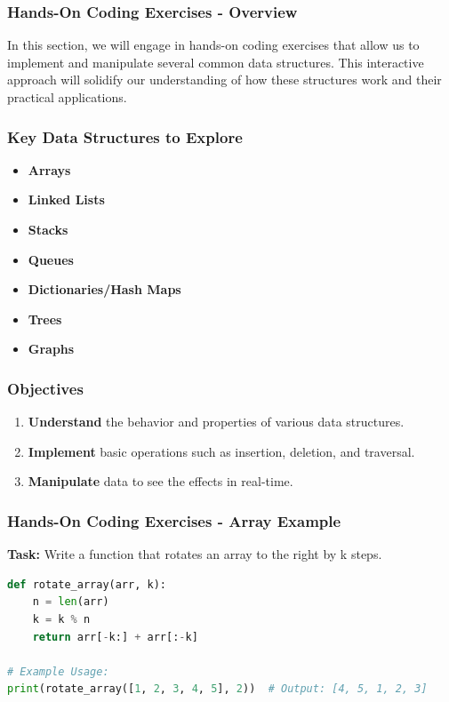 \documentclass{beamer}
\begin{document}
\begin{frame}[fragile]
    \frametitle{Hands-On Coding Exercises - Overview}
    In this section, we will engage in hands-on coding exercises that allow us to implement and manipulate several common data structures. This interactive approach will solidify our understanding of how these structures work and their practical applications.
\end{frame}

\begin{frame}
    \frametitle{Key Data Structures to Explore}
    \begin{itemize}
        \item \textbf{Arrays}
        \item \textbf{Linked Lists}
        \item \textbf{Stacks}
        \item \textbf{Queues}
        \item \textbf{Dictionaries/Hash Maps}
        \item \textbf{Trees}
        \item \textbf{Graphs}
    \end{itemize}
\end{frame}

\begin{frame}
    \frametitle{Objectives}
    \begin{enumerate}
        \item \textbf{Understand} the behavior and properties of various data structures.
        \item \textbf{Implement} basic operations such as insertion, deletion, and traversal.
        \item \textbf{Manipulate} data to see the effects in real-time.
    \end{enumerate}
\end{frame}

\begin{frame}[fragile]
    \frametitle{Hands-On Coding Exercises - Array Example}
    \textbf{Task:} Write a function that rotates an array to the right by k steps.

    \begin{lstlisting}[language=Python]
def rotate_array(arr, k):
    n = len(arr)
    k = k % n
    return arr[-k:] + arr[:-k]

# Example Usage:
print(rotate_array([1, 2, 3, 4, 5], 2))  # Output: [4, 5, 1, 2, 3]
    \end{lstlisting}
\end{frame}
\end{document}
